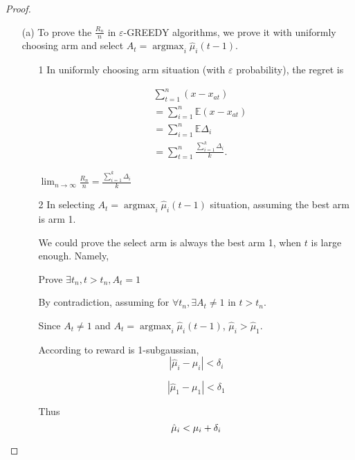 \begin{proof}

\begin{enumerate}
    \item [(a)]
        To prove the $\frac {R_n} {n}$ in $\varepsilon$-GREEDY algorithms, we prove it with uniformly choosing arm and select $A_{t}=\operatorname{argmax}_{i} \hat{\mu}_{i}(t-1)$.
    
        \begin{enumerate}
        \item [1] In uniformly choosing arm situation (with $\varepsilon$ probability), the regret is 
        
            $$
            \begin{aligned}
            & \sum_{t=1}^{n}\left(x-x_{a t}\right) \\
            &=\sum_{i=1}^{n} \mathbb {E} \left(x-x_{a t}\right)\\
            &=\sum_{i=1}^{n} \mathbb {E} \Delta_{i} \\
            &=\sum_{t=1}^{n}\frac{\sum_{i=1}^{k} \Delta_{i}}{k}.
            \end{aligned}
            $$
        
            $\lim _{n \rightarrow \infty} \frac{R_{n}}{n}=\frac{\sum_{i=1}^{k} \Delta_{i}}{k}$
    
        \item [2] In selecting $A_{t}=\operatorname{argmax}_{i} \hat{\mu}_{i}(t-1)$ situation, assuming the best arm is arm 1.
        
            We could prove the select arm is always the best arm 1, when $t$ is large enough. Namely, 
        
            Prove $\exists t_n, t > t_n, A_t = 1$
        
            By contradiction, assuming for $\forall t_n, \exists A_t \neq 1$ in $t > t_n$.
        
            Since $A_t \neq 1$ and $A_{t}=\operatorname{argmax}_{i} \hat{\mu}_{i}(t-1)$, $\hat \mu_i > \hat \mu_1$.
            
            According to reward is 1-subgaussian, 
            $$
            \left | \hat \mu_i - \mu_i \right | < \delta_i
            $$
            
            $$
            \left | \hat \mu_1 - \mu_1 \right | < \delta_1
            $$

            Thus
            $$
            \hat \mu_i < \mu_i + \delta_i \\
            $$
            

\end{enumerate}
\end{enumerate}
\end{proof}

